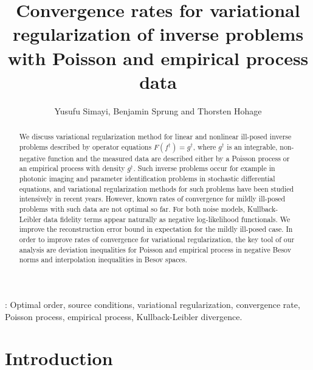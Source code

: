 \documentclass[10pt]{iopart}
\begin{document}
\title[Convergence rates for Poisson and empirical data]{Convergence rates for variational regularization
of inverse problems with Poisson and empirical process data}

\author{Yusufu Simayi, Benjamin Sprung and Thorsten Hohage}

\address{Institute for Numerical and Applied Mathematics, University of G\"{o}ttingen,
Lotzestr. 16-18, 37083, G\"{o}ttingen, Germany}
\vspace{10pt}
\begin{indented}
\item[\today]
\end{indented}

\begin{abstract}
We discuss variational regularization method for linear and nonlinear ill-posed inverse problems described by operator 
equations $F(f^{\dagger})=g^{\dagger}$, where $g^{\dagger}$ is an integrable, non-negative function and the measured data are described 
either by a Poisson process or an empirical process with density $g^{\dagger}$. Such inverse problems occur for example in photonic imaging 
and parameter identification problems in stochastic differential equations, and variational regularization methods for such problems
have been studied intensively in recent years. However, known rates of convergence for mildly ill-posed problems with such data are not 
optimal so far. For both noise models, Kullback-Leibler data fidelity terms appear naturally as negative log-likelihood 
functionals. We improve the reconstruction error bound in expectation for the mildly ill-posed case. In order to improve
rates of convergence for variational regularization, the key tool of our analysis are deviation inequalities for Poisson and empirical 
process in negative Besov norms and interpolation inequalities in Besov spaces. 
\end{abstract}

: Optimal order, source conditions, variational regularization, convergence rate, Poisson process, empirical process, 
Kullback-Leibler divergence.




\section{Introduction}
\end{document}
